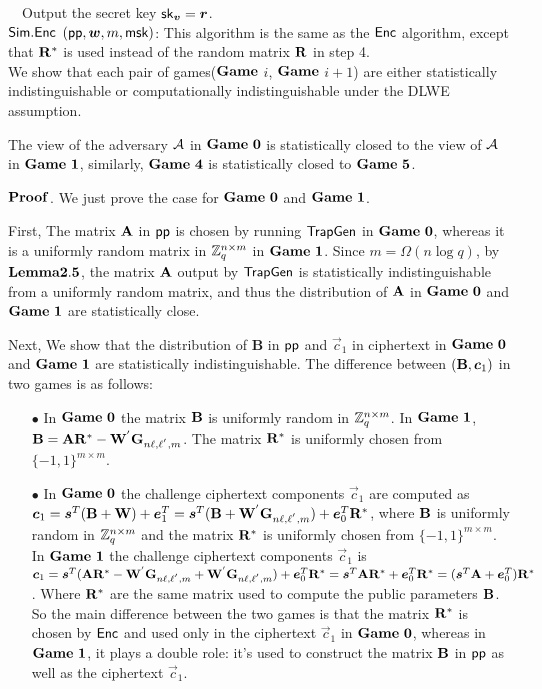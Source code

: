 ~~Output the secret key $\mathsf{sk}_{\boldsymbol{v}}=\boldsymbol{r}$.\\[0.4cm]
$\mathsf{Sim}.\mathsf{Enc}$ $(\mathsf{pp},\boldsymbol{w},m,\mathsf{msk})$: This algorithm is the same as the $\mathsf{Enc}$ algorithm, except that $\mathbf{R}^{*}$ is used instead of the random matrix $\mathbf{R}$ in step 4.\\[0.6cm]
We show that each pair of games($\mathbf{Game}$ $i$, $\mathbf{Game}$ $i+1$) are either statistically indistinguishable or computationally indistinguishable under the DLWE assumption.
\begin{lemma}
The view of the adversary $\mathcal{A}$ in $\mathbf{Game\ 0}$ is statistically closed to the view of $\mathcal{A}$ in $\mathbf{Game\ 1}$, similarly, $\mathbf{Game\ 4}$ is statistically closed to $\mathbf{Game\ 5}$.
\end{lemma}
\noindent $\mathbf{Proof}$. We just prove the case for $\mathbf{Game\ 0}$ and $\mathbf{Game\ 1}$.\

First, The matrix $\mathbf{A}$ in $\mathsf{pp}$ is chosen by running $\mathsf{TrapGen}$ in $\mathbf{Game\ 0}$, whereas it is a uniformly random matrix in $\mathbb{Z}^{n \times m}_{q}$ in $\mathbf{Game\ 1}$. Since $m=\Omega(n \log q)$, by $\mathbf{Lemma2.5}$, the matrix $\mathbf{A}$ output by $\mathsf{TrapGen}$  is statistically indistinguishable from a uniformly random matrix, and thus the distribution of $\mathbf{A}$ in $\mathbf{Game\ 0}$ and $\mathbf{Game\ 1}$ are statistically close.\

Next, We show that the distribution of \textbf{B} in $\mathsf{pp}$ and $\vec{c}_{1}$ in ciphertext in $\mathbf{Game\ 0}$ and $\mathbf{Game\ 1}$ are statistically indistinguishable. The difference between $(\mathbf{B},\boldsymbol{c}_{1})$ in two games is as follows:
\begin{itemize}
\item[$\bullet$] In $\mathbf{Game\ 0}$ the matrix $\mathbf{B}$ is uniformly random in $\mathbb{Z}^{n \times m}_{q}$. In $\mathbf{Game\ 1}$, $\mathbf{B}=\mathbf{A}\mathbf{R}^{*}-\mathbf{W}^{'}\mathbf{G}_{n\ell,\ell^{'},m}$. The matrix $\mathbf{R}^{*}$ is uniformly chosen from $\{-1,1\}^{m \times m}$.\\
\item[$\bullet$] In $\mathbf{Game\ 0}$ the challenge ciphertext components $\vec{c}_{1}$ are computed as $\boldsymbol{c}_{1}=\boldsymbol{s}^{T}(\mathbf{B}+\mathbf{W})+\boldsymbol{e}^{T}_{1}=\boldsymbol{s}^{T}(\mathbf{B}+\mathbf{W}^{'}\mathbf{G}_{n\ell,\ell^{'},m})+\boldsymbol{e}^{T}_{0}\mathbf{R}^{*}$, where $\mathbf{B}$ is uniformly random in $\mathbb{Z}^{n \times m}_{q}$ and the matrix $\mathbf{R}^{*}$ is uniformly chosen from $\{-1,1\}^{m \times m}$.\\
    In $\mathbf{Game\ 1}$ the challenge ciphertext components $\vec{c}_{1}$ is $\boldsymbol{c}_{1}=\boldsymbol{s}^{T}(\mathbf{A}\mathbf{R}^{*}-\mathbf{W}^{'}\mathbf{G}_{n\ell,\ell^{'},m}+\mathbf{W}^{'}\mathbf{G}_{n\ell,\ell^{'},m})+\boldsymbol{e}^{T}_{0}\mathbf{R}^{*}=\boldsymbol{s}^{T}\mathbf{A}\mathbf{R}^{*}+\boldsymbol{e}^{T}_{0}\mathbf{R}^{*}
    =(\boldsymbol{s}^{T}\mathbf{A}+\boldsymbol{e}^{T}_{0})\mathbf{R}^{*}$. Where $\mathbf{R}^{*}$ are the same matrix used to compute the public parameters $\mathbf{B}$. So the main difference between the two games is that the matrix $\mathbf{R}^{*}$ is chosen by $\mathsf{Enc}$ and used only in the ciphertext $\vec{c}_{1}$ in $\mathbf{Game\ 0}$, whereas in $\mathbf{Game\ 1}$, it plays a double role: it's used to construct the matrix $\mathbf{B}$ in $\mathsf{pp}$ as well as the ciphertext $\vec{c}_{1}$.
\end{itemize}

